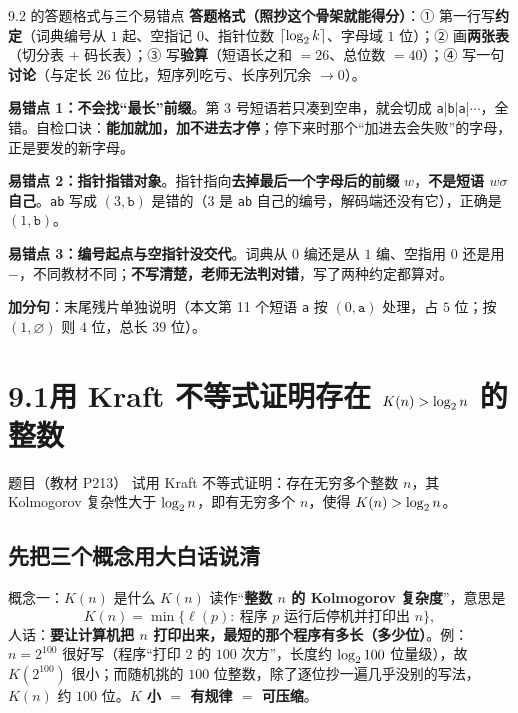\documentclass[11pt,a4paper]{ctexart}
\begin{document}
\begin{exam}{9.2 的答题格式与三个易错点}
\textbf{答题格式（照抄这个骨架就能得分）}：① 第一行写\textbf{约定}（词典编号从 $1$ 起、空指记 $0$、指针位数 $\lceil\log_{2} k\rceil$、字母域 $1$ 位）；② 画\textbf{两张表}（切分表 $+$ 码长表）；③ 写\textbf{验算}（短语长之和 $=26$、总位数 $=40$）；④ 写一句\textbf{讨论}（与定长 $26$ 位比，短序列吃亏、长序列冗余 $\to0$）。

\textbf{易错点 1：不会找“最长”前缀}。第 $3$ 号短语若只凑到空串，就会切成 \texttt{a}|\texttt{b}|\texttt{a}|$\cdots$，全错。自检口诀：\textbf{能加就加，加不进去才停}；停下来时那个“加进去会失败”的字母，正是要发的新字母。

\textbf{易错点 2：指针指错对象}。指针指向\textbf{去掉最后一个字母后的前缀} $w$，\textbf{不是短语 $w\sigma$ 自己}。\texttt{ab} 写成 $(3,\texttt b)$ 是错的（$3$ 是 \texttt{ab} 自己的编号，解码端还没有它），正确是 $(1,\texttt b)$。

\textbf{易错点 3：编号起点与空指针没交代}。词典从 $0$ 编还是从 $1$ 编、空指用 $0$ 还是用 $-$，不同教材不同；\textbf{不写清楚，老师无法判对错}，写了两种约定都算对。

\textbf{加分句}：末尾残片单独说明（本文第 11 个短语 \texttt a 按 $(0,\texttt a)$ 处理，占 $5$ 位；按 $(1,\varnothing)$ 则 $4$ 位，总长 $39$ 位）。
\end{exam}

\section{9.1\quad 用 Kraft 不等式证明存在 $K(n)>\log_{2} n$ 的整数}
\label{sec:kolmo}

\begin{defbox}{题目（教材 P213）}
试用 Kraft 不等式证明：存在无穷多个整数 $n$，其 Kolmogorov 复杂性大于 $\log_{2} n$，即有无穷多个 $n$，使得 $K(n)>\log_{2} n$。
\end{defbox}

\subsection{先把三个概念用大白话说清}

\begin{defbox}{概念一：$K(n)$ 是什么}
$K(n)$ 读作“\textbf{整数 $n$ 的 Kolmogorov 复杂度}”，意思是
\[
K(n)=\min\big\{\ell(p):\ \text{程序 }p\text{ 运行后停机并打印出 }n\big\},
\]
人话：\textbf{要让计算机把 $n$ 打印出来，最短的那个程序有多长（多少位）}。例：$n=2^{100}$ 很好写（程序“打印 $2$ 的 $100$ 次方”，长度约 $\log_{2}100$ 位量级），故 $K(2^{100})$ 很小；而随机挑的 $100$ 位整数，除了逐位抄一遍几乎没别的写法，$K(n)$ 约 $100$ 位。\textbf{$K$ 小 $=$ 有规律 $=$ 可压缩}。
\end{defbox}
\end{document}

